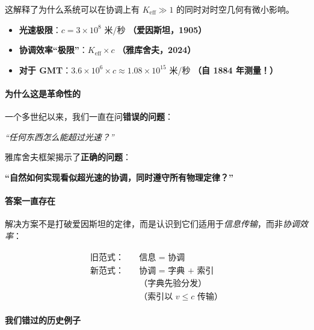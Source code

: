 \documentclass[11pt,a4paper]{article}
\begin{document}
	这解释了为什么系统可以在协调上有 $K_{\mathrm{eff}} \gg 1$ 的同时对时空几何有微小影响。
	
	\begin{itemize}
		\item \textbf{光速极限}：$c = 3 \times 10^8$ 米/秒 \textbf{（爱因斯坦，1905）}
		\item \textbf{协调效率“极限”}：$K_{\mathrm{eff}} \times c$ \textbf{（雅库舍夫，2024）}
		\item \textbf{对于 GMT}：$3.6 \times 10^6 \times c \approx 1.08 \times 10^{15}$ 米/秒 \textbf{（自 1884 年测量！）}
	\end{itemize}
	
	\paragraph{为什么这是革命性的}
	一个多世纪以来，我们一直在问\textbf{错误的问题}：
	\begin{center}
		\itshape “任何东西怎么能超过光速？”
	\end{center}
	
	雅库舍夫框架揭示了\textbf{正确的问题}：
	\begin{center}
		\bfseries “自然如何实现看似超光速的协调，同时遵守所有物理定律？”
	\end{center}
	
	\paragraph{答案一直存在}
	解决方案不是打破爱因斯坦的定律，而是认识到它们适用于\emph{信息传输}，而非\emph{协调效率}：
	
	\begin{align*}
		\textbf{旧范式：} & \quad \text{信息 = 协调} \\
		\textbf{新范式：} & \quad \text{协调 = 字典 + 索引} \\
		& \quad \text{（字典先验分发）} \\
		& \quad \text{（索引以 $v \leq c$ 传输）}
	\end{align*}
	
	\paragraph{我们错过的历史例子}
	
\end{document}
